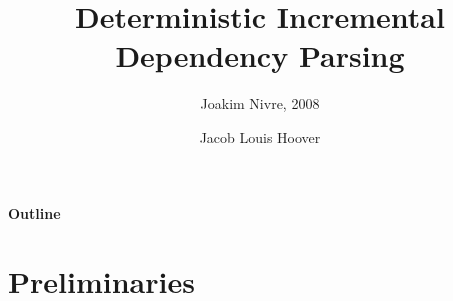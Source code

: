\documentclass[10pt]{beamer}%
\title{Deterministic Incremental Dependency Parsing}
\subtitle{Joakim Nivre, 2008}
\author{Jacob Louis Hoover}
\theoremstyle{remark}
\begin{document}

{%
  \maketitle
  \begin{frame}%
    \paragraph{Outline}
    \tableofcontents
  \end{frame}
}


\section{Preliminaries}
\end{document}
